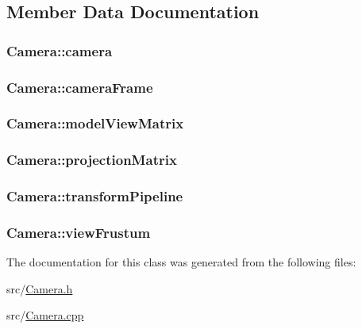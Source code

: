 \subsection{Member Data Documentation}
\hypertarget{class_camera_a13d3701406fb54feeb9d1a7c9055d23d}{
\subsubsection[{camera}]{ Camera\-::camera}}\label{class_camera_a13d3701406fb54feeb9d1a7c9055d23d}
\hypertarget{class_camera_a4f30974092fec6f63a1aa5902d213f1a}{
\subsubsection[{camera\-Frame}]{ Camera\-::camera\-Frame}}\label{class_camera_a4f30974092fec6f63a1aa5902d213f1a}
\hypertarget{class_camera_aa9ebe4548ff6926ca2b23808f03f1c2f}{
\subsubsection[{model\-View\-Matrix}]{ Camera\-::model\-View\-Matrix}}\label{class_camera_aa9ebe4548ff6926ca2b23808f03f1c2f}
\hypertarget{class_camera_ac673d4053983e72dec3b48187441a3c6}{
\subsubsection[{projection\-Matrix}]{ Camera\-::projection\-Matrix}}\label{class_camera_ac673d4053983e72dec3b48187441a3c6}
\hypertarget{class_camera_a262ad4e818859be2f115aac8320140d3}{
\subsubsection[{transform\-Pipeline}]{ Camera\-::transform\-Pipeline}}\label{class_camera_a262ad4e818859be2f115aac8320140d3}
\hypertarget{class_camera_a0fc284a14ea8c5553dd5d88b34c18c36}{
\subsubsection[{view\-Frustum}]{ Camera\-::view\-Frustum}}\label{class_camera_a0fc284a14ea8c5553dd5d88b34c18c36}


The documentation for this class was generated from the following files\-:\begin{DoxyCompactItemize}
\item 
src/\hyperlink{src_2camera_8h}{Camera.\-h}\item 
src/\hyperlink{_camera_8cpp}{Camera.\-cpp}\end{DoxyCompactItemize}
